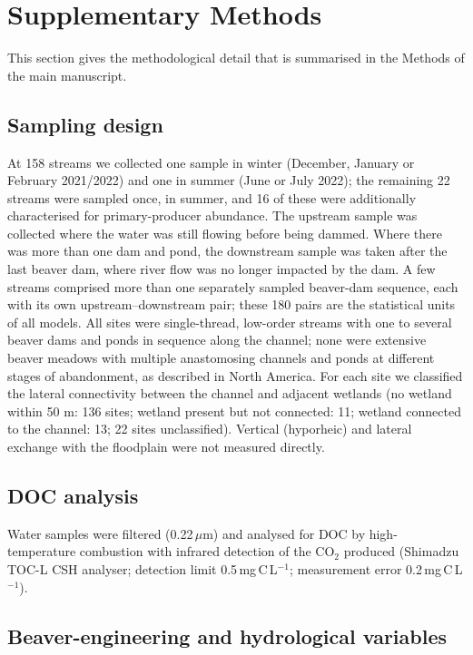 \documentclass[11pt,a4paper]{article}
\begin{document}
\clearpage
\section*{Supplementary Methods}

This section gives the methodological detail that is summarised in the Methods of the main manuscript.

\subsection*{Sampling design}

At 158 streams we collected one sample in winter (December, January or February 2021/2022) and one in summer (June or July 2022); the remaining 22 streams were sampled once, in summer, and 16 of these were additionally characterised for primary-producer abundance. The upstream sample was collected where the water was still flowing before being dammed. Where there was more than one dam and pond, the downstream sample was taken after the last beaver dam, where river flow was no longer impacted by the dam. A few streams comprised more than one separately sampled beaver-dam sequence, each with its own upstream--downstream pair; these 180 pairs are the statistical units of all models. All sites were single-thread, low-order streams with one to several beaver dams and ponds in sequence along the channel; none were extensive beaver meadows with multiple anastomosing channels and ponds at different stages of abandonment, as described in North America. For each site we classified the lateral connectivity between the channel and adjacent wetlands (no wetland within 50 m: 136 sites; wetland present but not connected: 11; wetland connected to the channel: 13; 22 sites unclassified). Vertical (hyporheic) and lateral exchange with the floodplain were not measured directly.

\subsection*{DOC analysis}

Water samples were filtered (0.22\,$\mu$m) and analysed for DOC by high-temperature combustion with infrared detection of the CO$_2$ produced (Shimadzu TOC-L CSH analyser; detection limit 0.5\,mg\,C\,L$^{-1}$; measurement error 0.2\,mg\,C\,L$^{-1}$).

\subsection*{Beaver-engineering and hydrological variables}
\end{document}
